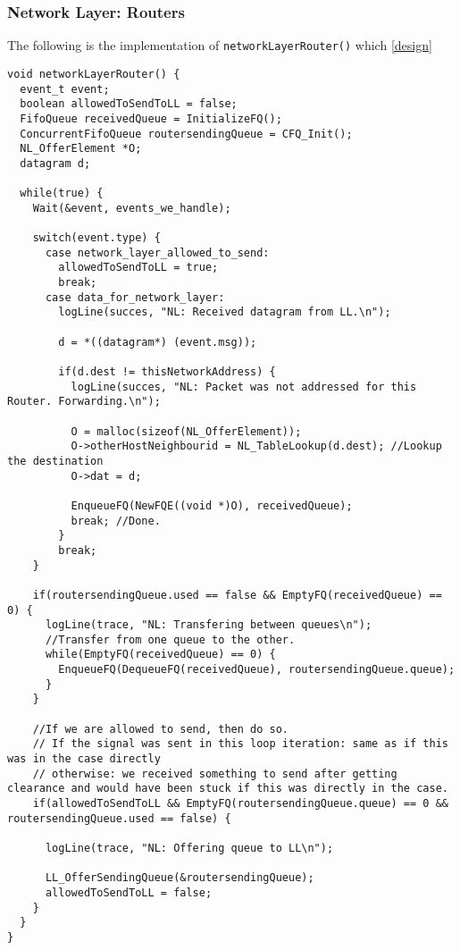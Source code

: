 \subsubsection{Network Layer: Routers}

The following is the implementation of \texttt{networkLayerRouter()} which \ref{design}
\begin{lstlisting}
void networkLayerRouter() {
  event_t event;
  boolean allowedToSendToLL = false;
  FifoQueue receivedQueue = InitializeFQ();
  ConcurrentFifoQueue routersendingQueue = CFQ_Init();
  NL_OfferElement *O;
  datagram d;

  while(true) {
    Wait(&event, events_we_handle);

    switch(event.type) {
      case network_layer_allowed_to_send:
        allowedToSendToLL = true;
        break;
      case data_for_network_layer:
        logLine(succes, "NL: Received datagram from LL.\n");

        d = *((datagram*) (event.msg));

        if(d.dest != thisNetworkAddress) {
          logLine(succes, "NL: Packet was not addressed for this Router. Forwarding.\n");

          O = malloc(sizeof(NL_OfferElement));
          O->otherHostNeighbourid = NL_TableLookup(d.dest); //Lookup the destination
          O->dat = d;

          EnqueueFQ(NewFQE((void *)O), receivedQueue);
          break; //Done.
        }
        break;
    }

    if(routersendingQueue.used == false && EmptyFQ(receivedQueue) == 0) {
      logLine(trace, "NL: Transfering between queues\n");
      //Transfer from one queue to the other.
      while(EmptyFQ(receivedQueue) == 0) {
        EnqueueFQ(DequeueFQ(receivedQueue), routersendingQueue.queue);
      }
    }

    //If we are allowed to send, then do so.
    // If the signal was sent in this loop iteration: same as if this was in the case directly
    // otherwise: we received something to send after getting clearance and would have been stuck if this was directly in the case.
    if(allowedToSendToLL && EmptyFQ(routersendingQueue.queue) == 0 && routersendingQueue.used == false) {

      logLine(trace, "NL: Offering queue to LL\n");

      LL_OfferSendingQueue(&routersendingQueue);
      allowedToSendToLL = false;
    }
  }
}
\end{lstlisting}



